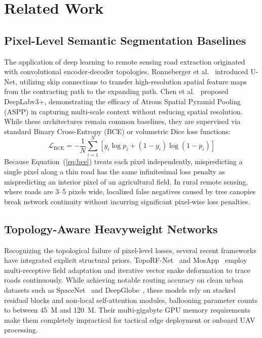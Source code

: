 \documentclass[conference]{IEEEtran}
\begin{document}
\section{Related Work}
\label{sec:related_work}

\subsection{Pixel-Level Semantic Segmentation Baselines}
The application of deep learning to remote sensing road extraction originated with convolutional encoder-decoder topologies. Ronneberger et al.~\cite{ronneberger2015unet} introduced U-Net, utilizing skip connections to transfer high-resolution spatial feature maps from the contracting path to the expanding path. Chen et al.~\cite{chen2017deeplab} proposed DeepLabv3+, demonstrating the efficacy of Atrous Spatial Pyramid Pooling (ASPP) in capturing multi-scale context without reducing spatial resolution. While these architectures remain common baselines, they are supervised via standard Binary Cross-Entropy (BCE) or volumetric Dice loss functions:
\begin{equation}
    \mathcal{L}_{\text{BCE}} = -\frac{1}{N} \sum_{i=1}^N \left[ y_i \log p_i + (1 - y_i) \log(1 - p_i) \right]
    \label{eq:bce}
\end{equation}
Because Equation~(\ref{eq:bce}) treats each pixel independently, mispredicting a single pixel along a thin road has the same infinitesimal loss penalty as mispredicting an interior pixel of an agricultural field. In rural remote sensing, where roads are 3--5 pixels wide, localized false negatives caused by tree canopies break network continuity without incurring significant pixel-wise loss penalties.

\subsection{Topology-Aware Heavyweight Networks}
Recognizing the topological failure of pixel-level losses, several recent frameworks have integrated explicit structural priors. TopoRF-Net~\cite{toporf2025} and MosApp~\cite{mosapp2024} employ multi-receptive field adaptation and iterative vector snake deformation to trace roads continuously. While achieving notable routing accuracy on clean urban datasets such as SpaceNet~\cite{vanetten2018spacenet} and DeepGlobe~\cite{demir2018deepglobe}, these models rely on stacked residual blocks and non-local self-attention modules, ballooning parameter counts to between 45~M and 120~M. Their multi-gigabyte GPU memory requirements make them completely impractical for tactical edge deployment or onboard UAV processing.
\end{document}
